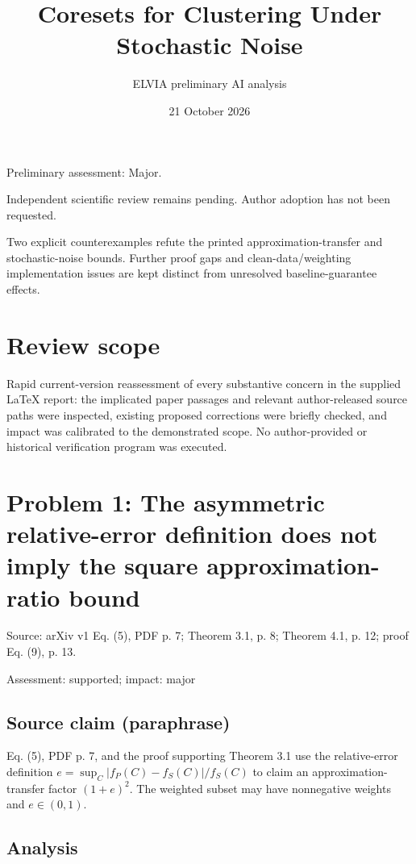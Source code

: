 \documentclass[11pt]{article}
\begin{document}
\title{Coresets for Clustering Under Stochastic Noise}

\author{ELVIA preliminary AI analysis}\date{21 October 2026}\maketitle

Preliminary assessment: Major.\par

Independent scientific review remains pending. Author adoption has not been requested.

Two explicit counterexamples refute the printed approximation-transfer and stochastic-noise bounds. Further proof gaps and clean-data/weighting implementation issues are kept distinct from unresolved baseline-guarantee effects.

\section*{Review scope}

Rapid current-version reassessment of every substantive concern in the supplied LaTeX report: the implicated paper passages and relevant author-released source paths were inspected, existing proposed corrections were briefly checked, and impact was calibrated to the demonstrated scope. No author-provided or historical verification program was executed.

\section*{Problem 1: The asymmetric relative-error definition does not imply the square approximation-ratio bound}

Source: arXiv v1 Eq. (5), PDF p. 7; Theorem 3.1, p. 8; Theorem 4.1, p. 12; proof Eq. (9), p. 13.

Assessment: supported; impact: major

\subsection*{Source claim (paraphrase)}

Eq. (5), PDF p. 7, and the proof supporting Theorem 3.1 use the relative-error definition \(e=\sup_C|f_P(C)-f_S(C)|/f_S(C)\) to claim an approximation-transfer factor \((1+e)^2\). The weighted subset may have nonnegative weights and \(e\in(0,1)\).

\subsection*{Analysis}
\end{document}
